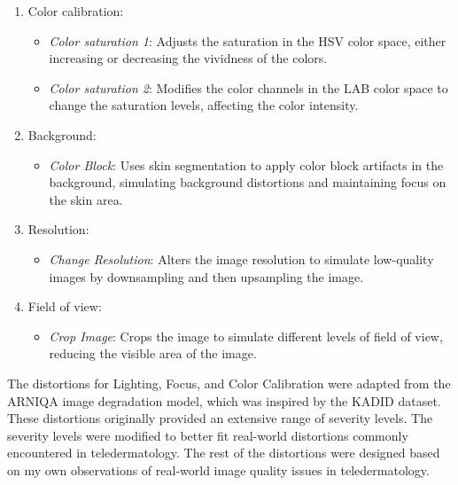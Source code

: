\begin{enumerate}
\begin{itemize}
        \end{itemize}
    \item Color calibration:
        \begin{itemize}
            \item \textit{Color saturation 1}: Adjusts the saturation in the HSV color space, either increasing or decreasing the vividness of the colors.
            \item \textit{Color saturation 2}: Modifies the color channels in the LAB color space to change the saturation levels, affecting the color intensity.
        \end{itemize}
    \item Background:
        \begin{itemize}
            \item \textit{Color Block}: Uses skin segmentation to apply color block artifacts in the background, simulating background distortions and maintaining focus on the skin area.
        \end{itemize}
    \item Resolution:
        \begin{itemize}
            \item \textit{Change Resolution}: Alters the image resolution to simulate low-quality images by downsampling and then upsampling the image.
        \end{itemize}
    \item Field of view:
        \begin{itemize}
            \item \textit{Crop Image}: Crops the image to simulate different levels of field of view, reducing the visible area of the image.
        \end{itemize}
\end{enumerate}
\vspace{\baselineskip}
\noindent
The distortions for Lighting, Focus, and Color Calibration were adapted from the ARNIQA \autocite{ARNIQA} image degradation model, which was inspired by the KADID \autocite{KADID10k} dataset. These distortions originally provided an extensive range of severity levels. The severity levels were modified to better fit real-world distortions commonly encountered in teledermatology. The rest of the distortions were designed based on my own observations of real-world image quality issues in teledermatology. \par
\vspace{\baselineskip}
\noindent
